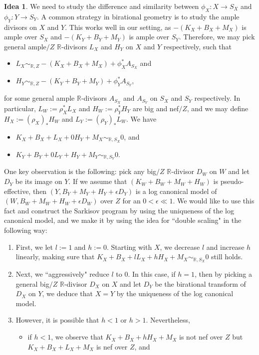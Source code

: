 \documentclass[11pt]{amsart}
\numberwithin{equation}{section}
\newcommand{\Rr}{\mathbb{R}}
\theoremstyle{definition}
\newtheorem{idea}[thm]{Idea}
\theoremstyle{remark}
\theoremstyle{definition}
\begin{document}
\begin{idea}
We need to study the difference and similarity between $\phi_X: X\rightarrow S_X$ and $\phi_Y: Y\rightarrow S_Y$. A common strategy in birational geometry is to study the ample divisors on $X$ and $Y$. This works well in our setting, as $-(K_X+B_X+M_X)$ is ample over $S_X$ and  $-(K_Y+B_Y+M_Y)$ is ample over $S_Y$. Therefore, we may pick general ample$/Z$ $\Rr$-divisors $L_X$ and $H_Y$ on $X$ and $Y$ respectively, such that
\begin{itemize}
    \item $L_X\sim_{\Rr,Z}-(K_X+B_X+M_X)+\phi_X^*A_{S_X}$ and
    \item $H_Y\sim_{\Rr,Z}-(K_Y+B_Y+M_Y)+\phi_Y^*A_{S_Y}$, 
\end{itemize}
for some general ample $\Rr$-divisors $A_{S_X}$ and $A_{S_Y}$ on $S_X$ and $S_Y$ respectively. In particular, $L_W:=\rho_X^*L_X$ and $H_W:=\rho_Y^*H_Y$ are big and nef$/Z$, and we may define $H_X:=(\rho_X)_*H_W$ and $L_Y:=(\rho_Y)_*L_W$. We have
\begin{itemize}
    \item $K_X+B_X+L_X+0H_Y+M_X\sim_{\mathbb R,S_X}0$, and
    \item $K_Y+B_Y+0L_Y+H_Y+M_Y\sim_{\mathbb R,S_Y}0$.
\end{itemize}
One key observation is the following: pick any big$/Z$ $\Rr$-divisor $D_W$ on $W$ and let $D_Y$ be its image on $Y$. If we assume that $(K_W+B_W+M_W+H_W)$ is pseudo-effective, then $(Y,B_Y+M_Y+H_Y+\epsilon D_Y)$ is a log canonical model of $(W,B_W+M_W+H_W+\epsilon D_W)$ over $Z$ for an $0<\epsilon\ll 1$. We would like to use this fact and construct the Sarkisov program by using the uniqueness of the log canonical model, and we make it by using the idea for ``double scaling" in the following way:
\begin{enumerate}
    \item First, we let $l:=1$ and $h:=0$. Starting with $X$, we decrease $l$ and increase $h$ linearly, making sure that $K_X+B_X+lL_X+hH_X+M_X\sim_{\mathbb R,S_X}0$ still holds. 
    \item Next, we ``aggressively" reduce $l$ to $0$. In this case, if $h=1$, then by picking a general big$/Z$ $\Rr$-divisor $D_X$ on $X$ and let $D_Y$ be the birational transform of $D_X$ on $Y$, we deduce that $X=Y$ by the uniqueness of the log canonical model. 
    \item However, it is possible that $h<1$ or $h>1$. Nevertheless, 
    \begin{itemize}
        \item if $h<1$, we observe that $K_X+B_X+hH_X+M_X$ is not nef over $Z$ but $K_X+B_X+L_X+M_X$ is nef over $Z$, and

\end{itemize}
\end{enumerate}
\end{idea}
\end{document}
